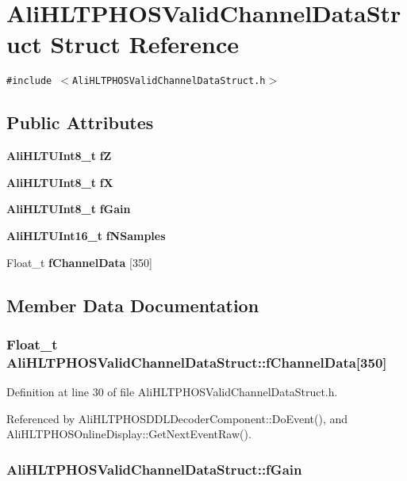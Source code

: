 \section{Ali\-HLTPHOSValid\-Channel\-Data\-Struct Struct Reference}
\label{structAliHLTPHOSValidChannelDataStruct}
{\tt \#include $<$Ali\-HLTPHOSValid\-Channel\-Data\-Struct.h$>$}

\subsection*{Public Attributes}
\begin{CompactItemize}
\item 
{\bf Ali\-HLTUInt8\_\-t} {\bf f\-Z}
\item 
{\bf Ali\-HLTUInt8\_\-t} {\bf f\-X}
\item 
{\bf Ali\-HLTUInt8\_\-t} {\bf f\-Gain}
\item 
{\bf Ali\-HLTUInt16\_\-t} {\bf f\-NSamples}
\item 
Float\_\-t {\bf f\-Channel\-Data} [350]
\end{CompactItemize}


\subsection{Member Data Documentation}
\subsubsection{\setlength{\rightskip}{0pt plus 5cm}Float\_\-t {\bf Ali\-HLTPHOSValid\-Channel\-Data\-Struct::f\-Channel\-Data}[350]}\label{structAliHLTPHOSValidChannelDataStruct_o4}




Definition at line 30 of file Ali\-HLTPHOSValid\-Channel\-Data\-Struct.h.

Referenced by Ali\-HLTPHOSDDLDecoder\-Component::Do\-Event(), and Ali\-HLTPHOSOnline\-Display::Get\-Next\-Event\-Raw().
\subsubsection{ {\bf Ali\-HLTPHOSValid\-Channel\-Data\-Struct::f\-Gain}}\label{structAliHLTPHOSValidChannelDataStruct_o2}




